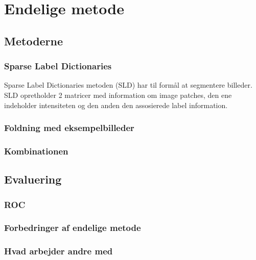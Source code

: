 \section{Endelige metode}
\subsection{Metoderne}
\subsubsection{Sparse Label Dictionaries}	%




Sparse Label Dictionaries metoden (SLD) har til formål at segmentere billeder. SLD opretholder 2 matricer med information om image patches, den ene indeholder intensiteten og den anden den assosierede label information.

\subsubsection{Foldning med eksempelbilleder} %
\subsubsection{Kombinationen} %
\subsection{Evaluering}
\subsubsection{ROC}
\subsubsection{Forbedringer af endelige metode}
\subsubsection{Hvad arbejder andre med} %
